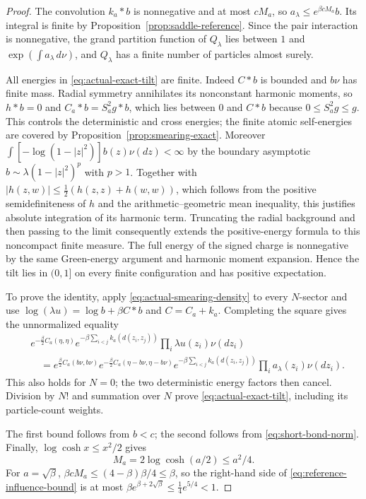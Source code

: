 \documentclass[11pt]{article}
\theoremstyle{remark}\newtheorem{remark}[theorem]{Remark}
\begin{document}
\begin{proof}
The convolution $k_a*b$ is nonnegative and at most $cM_a$, so
$a_\lambda\le e^{\beta cM_a}b$.  Its integral is finite by
Proposition~\ref{prop:saddle-reference}.  Since the pair interaction is
nonnegative, the grand partition function of $Q_\lambda$ lies between
$1$ and $\exp(\int a_\lambda\,d\nu)$, and $Q_\lambda$ has a finite
number of particles almost surely.

All energies in \eqref{eq:actual-exact-tilt} are finite.
Indeed $C*b$ is bounded and $b\nu$ has finite mass.  Radial symmetry
annihilates its nonconstant harmonic moments, so $h*b=0$ and
$C_a*b=S_a^2g*b$, which lies between $0$ and $C*b$ because
$0\le S_a^2g\le g$.  This controls the deterministic and cross energies;
the finite atomic self-energies are covered by
Proposition~\ref{prop:smearing-exact}.  Moreover
$\int[-\log(1-|z|^2)]b(z)\nu(dz)<\infty$ by the boundary asymptotic
$b\sim\lambda(1-|z|^2)^p$ with $p>1$.  Together with
$|h(z,w)|\le\frac12(h(z,z)+h(w,w))$, which follows from the positive
semidefiniteness of $h$ and the arithmetic--geometric mean inequality,
this justifies absolute integration of its harmonic term.  Truncating
the radial background and then passing to the limit consequently
extends the positive-energy formula to this noncompact finite measure.
The full energy of the signed
charge is nonnegative by the same Green-energy argument and harmonic
moment expansion.  Hence the tilt lies in $(0,1]$ on every finite
configuration and has positive expectation.

To prove the identity, apply \eqref{eq:actual-smearing-density} to
every $N$-sector and use
$\log(\lambda u)=\log b+\beta C*b$ and $C=C_a+k_a$.
Completing the square gives the unnormalized equality
\begin{align*}
 &e^{-\frac\beta2 C_a(\eta,\eta)}
   e^{-\beta\sum_{i<j}k_a(d(z_i,z_j))}
   \prod_i\lambda u(z_i)\nu(dz_i)\\
 &\quad=e^{\frac\beta2 C_a(b\nu,b\nu)}
   e^{-\frac\beta2 C_a(\eta-b\nu,\eta-b\nu)}
   e^{-\beta\sum_{i<j}k_a(d(z_i,z_j))}
   \prod_i a_\lambda(z_i)\nu(dz_i).
\end{align*}
This also holds for $N=0$; the two deterministic energy factors then
cancel.  Division by $N!$ and summation over $N$ prove
\eqref{eq:actual-exact-tilt}, including its particle-count weights.

The first bound follows from $b<c$; the second follows from
\eqref{eq:short-bond-norm}.  Finally, $\log\cosh x\le x^2/2$ gives
\[
 M_a=2\log\cosh(a/2)\le a^2/4.
\]
For $a=\sqrt\beta$,
$\beta cM_a\le(4-\beta)\beta/4\le\beta$, so the right-hand side
of \eqref{eq:reference-influence-bound} is at most
$\beta e^{\beta+2\sqrt\beta}\le\frac14e^{5/4}<1$.
\end{proof}
\end{document}
